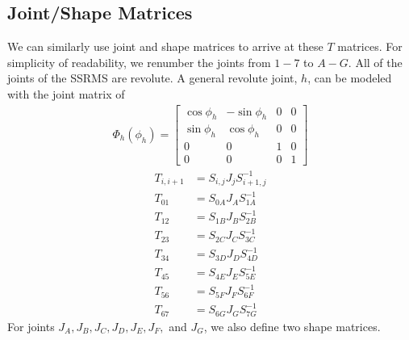 \documentclass{article}
\begin{document}
\subsection{Joint/Shape Matrices}
We can similarly use joint and shape matrices to arrive at these $T$ matrices.
For simplicity of readability, we renumber the joints from $1-7$ to $A-G$.
All of the joints of the SSRMS are revolute.
A general revolute joint, $h$, can be modeled with the joint matrix of
\begin{align*}
\Phi_h \left( \phi_h \right) =
\left[\begin{matrix}
\cos \phi_h & -\sin \phi_h & 0 & 0 \\
\sin \phi_h & \cos \phi_h & 0 & 0 \\
0 & 0 & 1 & 0 \\
0 & 0 & 0 & 1
\end{matrix}\right]
\end{align*}
\begin{align}
T_{i,i+1} &= S_{i, j} J_j S_{i+1,j}^{-1} \label{joint_eq} \\
T_{01} &= S_{0A} J_A S_{1A}^{-1} \nonumber \\
T_{12} &= S_{1B} J_B S_{2B}^{-1} \nonumber \\
T_{23} &= S_{2C} J_C S_{3C}^{-1} \nonumber \\
T_{34} &= S_{3D} J_D S_{4D}^{-1} \nonumber \\
T_{45} &= S_{4E} J_E S_{5E}^{-1} \nonumber \\
T_{56} &= S_{5F} J_F S_{6F}^{-1} \nonumber \\
T_{67} &= S_{6G} J_G S_{7G}^{-1} \nonumber
\end{align}
For joints $J_A, J_B, J_C, J_D, J_E, J_F,$ and $J_G$, we also define two shape matrices.
\end{document}
